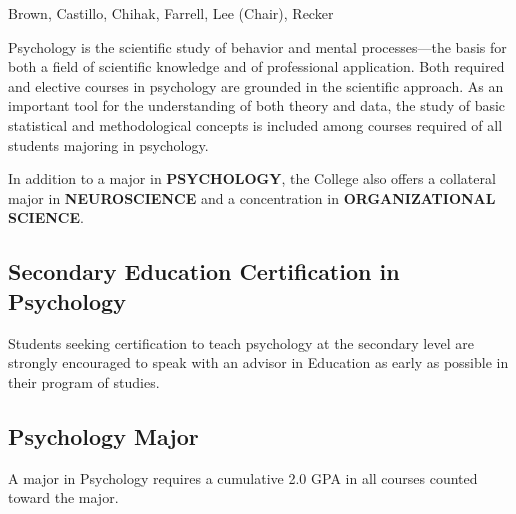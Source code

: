 \documentclass[
  letterpaper,
]{scrbook}
\begin{document}
Brown, Castillo, Chihak, Farrell, Lee (Chair), Recker

Psychology is the scientific study of behavior and mental
processes---the basis for both a field of scientific knowledge and of
professional application. Both required and elective courses in
psychology are grounded in the scientific approach. As an important tool
for the understanding of both theory and data, the study of basic
statistical and methodological concepts is included among courses
required of all students majoring in psychology.

In addition to a major in \textbf{PSYCHOLOGY}, the College also offers a
collateral major in \textbf{NEUROSCIENCE} and a concentration in
\textbf{ORGANIZATIONAL SCIENCE}.

\subsection{Secondary Education Certification in
Psychology}\label{secondary-education-certification-in-psychology}

Students seeking certification to teach psychology at the secondary
level are strongly encouraged to speak with an advisor in Education as
early as possible in their program of studies.

\subsection{Psychology Major}\label{psychology-major}

A major in Psychology requires a cumulative 2.0 GPA in all courses
counted toward the major.
\end{document}
